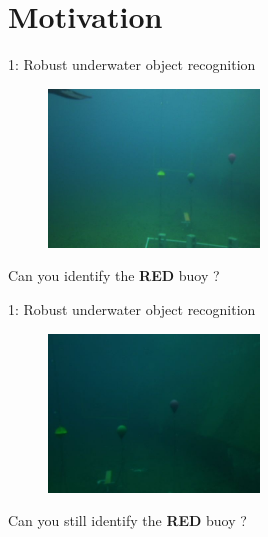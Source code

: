 \documentclass[13pt]{beamer}
\begin{document}
\section{Motivation}

\begin{frame}{1: Robust underwater object recognition}

  \begin{figure}[ht]
      \centering
      \includegraphics[width=0.5\textwidth, height=0.3\textwidth]{figs/problem1_1.png}
  \end{figure}

  Can you identify the {\color{red} \textbf{RED}} buoy ? 

\end{frame}

\begin{frame}{1: Robust underwater object recognition}

  \begin{figure}[ht]
      \centering
      \includegraphics[width=0.5\textwidth, height=0.3\textwidth]{figs/problem1_2.jpg}
  \end{figure}

  Can you still identify the {\color{red} \textbf{RED}} buoy ? 

\end{frame}
\end{document}
